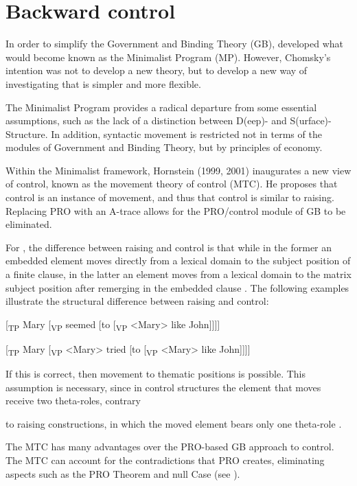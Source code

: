 \documentclass[output=paper]{langsci/langscibook}
\begin{document}
\section{Backward control}%

In order to simplify the Government and Binding Theory (GB), \citet{Chomsky1993} developed what would become known as the Minimalist Program (MP). However, Chomsky’s intention was not to develop a new theory, but to develop a new way of investigating that is simpler and more flexible.

The Minimalist Program provides a radical departure from some essential assumptions, such as the lack of a distinction between D(eep)- and S(urface)-Structure. In addition, syntactic movement is restricted not in terms of the modules of Government and Binding Theory, but by principles of economy. 

Within the Minimalist framework, Hornstein (1999, 2001) inaugurates a new view of control, known as the movement theory of control (MTC). He proposes that control is an instance of movement, and thus that control is similar to raising. Replacing PRO with an A-trace allows for the PRO/control module of GB to be eliminated.

For \citet{Hornstein1999}, the difference between raising and control is that while in the former an embedded element moves directly from a lexical domain to the subject position of a finite clause, in the latter an element moves from a lexical domain to the matrix subject position after remerging in the embedded clause \citep{Boeckx2006}. The following examples illustrate the structural difference between raising and control:

\ea%
    \label{ex:moreno:3}
[\textsubscript{TP} Mary [\textsubscript{VP} seemed [to [\textsubscript{VP} <Mary> like John]]]]
\z

\ea%
\label{ex:moreno:4}
[\textsubscript{TP} Mary [\textsubscript{VP} <Mary> tried [to [\textsubscript{VP} <Mary> like John]]]]
\z

If this is correct, then movement to thematic positions is possible. This assumption is necessary, since in control structures the element that moves receive two theta-roles, contrary

to raising constructions, in which the moved element bears only one theta-role \citep{Hornstein1999}.

The MTC has many advantages over the PRO-based GB approach to control. The MTC can account for the contradictions that PRO creates, eliminating aspects such as the PRO Theorem and null Case (see \citealt{Hornstein2001}). 
\end{document}
